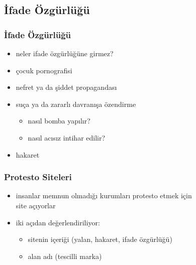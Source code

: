 \documentclass[dvipsnames]{beamer}
\theoremstyle{definition}
\theoremstyle{example}
\theoremstyle{plain}
\begin{document}
\subsection{İfade Özgürlüğü}

\begin{frame}
  \frametitle{İfade Özgürlüğü}

  \begin{itemize}
    \item neler ifade özgürlüğüne girmez?

    \pause
    \bigskip
    \item çocuk pornografisi

    \pause
    \item nefret ya da şiddet propagandası

    \pause
    \item suça ya da zararlı davranışa özendirme
    \begin{itemize}
      \item nasıl bomba yapılır?
      \item nasıl acısız intihar edilir?
    \end{itemize}

    \pause
    \item hakaret
  \end{itemize}
\end{frame}

\begin{frame}
  \frametitle{Protesto Siteleri}

  \begin{itemize}
    \item insanlar memnun olmadığı kurumları protesto etmek için\\
      site açıyorlar

    \medskip
    \item iki açıdan değerlendiriliyor:
    \begin{itemize}
      \item sitenin içeriği (yalan, hakaret, ifade özgürlüğü)
      \item alan adı (tescilli marka)
    \end{itemize}
  \end{itemize}
\end{frame}
\end{document}
